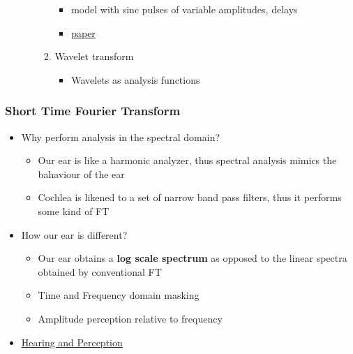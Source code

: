 \documentclass[11pt]{article}
\providecommand{\tightlist}{%
      \setlength{\itemsep}{0pt}\setlength{\parskip}{0pt}}
\begin{document}
\begin{itemize}
\begin{enumerate}
\begin{enumerate}
      \begin{itemize}
      \tightlist
      \item
        model with sinc pulses of variable amplitudes, delays
      \item
        \href{http://www.atiam.ircam.fr/wp-content/uploads/2011/12/AES_JAES_1978_Kaegi_VOSIM.pdf}{paper}
      \end{itemize}
    \item
      Wavelet transform

      \begin{itemize}
      \tightlist
      \item
        Wavelets as analysis functions
      \end{itemize}
    \end{enumerate}
  \end{enumerate}
\end{itemize}

    \subsubsection{Short Time Fourier
Transform}\label{short-time-fourier-transform}

    \begin{itemize}
\tightlist
\item
  Why perform analysis in the spectral domain?

  \begin{itemize}
  \tightlist
  \item
    Our ear is like a harmonic analyzer, thus spectral analysis mimics
    the bahaviour of the ear
  \item
    Cochlea is likened to a set of narrow band pass filters, thus it
    performs some kind of FT
  \end{itemize}
\item
  How our ear is different?

  \begin{itemize}
  \tightlist
  \item
    Our ear obtains a \textbf{log scale spectrum} as opposed to the
    linear spectra obtained by conventional FT
  \item
    Time and Frequency domain masking
  \item
    Amplitude perception relative to frequency
  \end{itemize}
\item
  \href{http://artsites.ucsc.edu/ems/music/tech_background/te-03/teces_03.html}{Hearing
  and Perception}
\end{itemize}
\end{document}
